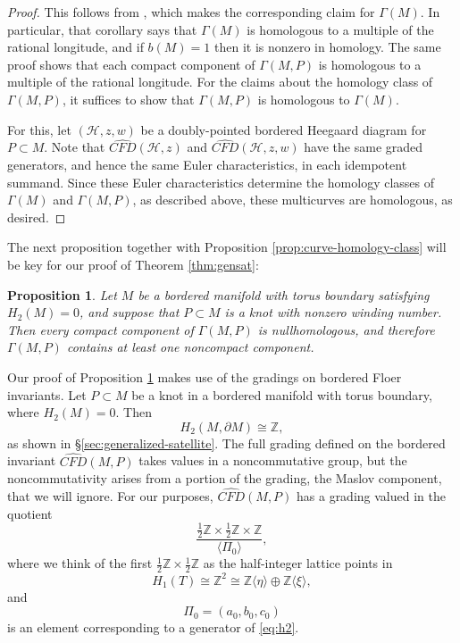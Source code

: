 \documentclass[11pt]{amsart}
\newtheorem {proposition}[theorem]{Proposition}
\numberwithin{equation}{section}
\numberwithin{theorem}{section}
\theoremstyle{definition}
\newcommand{\Z}{\mathbb{Z}}
\newcommand{\CFD}{\widehat{\mathit{CFD}}}
\begin{document}
\begin{proof}
This follows from \cite[Corollary 6.6]{hrw}, which makes the corresponding claim for $\Gamma(M)$. In particular, that corollary says that  $\Gamma(M)$ is homologous to a multiple of the rational longitude, and if $b(M)=1$ then it is nonzero in homology. The same proof shows that each compact component of $\Gamma(M, P)$ is homologous to a multiple of the rational longitude. For the claims about the  homology class of $\Gamma(M,P)$, it  suffices to show that $\Gamma(M,P)$ is homologous to $\Gamma(M)$. 

For this, let $(\mathcal{H},z,w)$ be a doubly-pointed bordered Heegaard diagram for $P\subset M$. Note that $\CFD(\mathcal{H},z)$ and $\CFD(\mathcal{H},z,w)$ have the same graded generators, and hence the same Euler characteristics, in each idempotent summand. Since these Euler characteristics determine the homology classes of $\Gamma(M)$ and $\Gamma(M,P)$, as described above, these multicurves are homologous, as desired.
\end{proof}

The next proposition together with Proposition \ref{prop:curve-homology-class} will be  key for our proof of Theorem \ref{thm:gensat}:

\begin{proposition}\label{prop:noncompact}
Let $M$ be a bordered manifold with torus boundary satisfying $H_2(M)=0$, and suppose that $P\subset M$ is a knot with nonzero winding number. Then every compact component of $\Gamma(M,P)$ is nullhomologous, and therefore $\Gamma(M, P)$ contains at least one noncompact component.
\end{proposition}


Our proof of Proposition \ref{prop:noncompact} makes use of the gradings on bordered Floer invariants. Let $P\subset M$ be a knot in a bordered manifold with torus boundary, where $H_2(M)=0$. Then
\begin{equation}\label{eq:h2}
H_2(M,\partial M)\cong \Z,
\end{equation}
as shown in \S\ref{sec:generalized-satellite}.  The full grading defined on the bordered invariant $\CFD(M,P)$ takes values in a noncommutative group, but the noncommutativity arises from a portion of the grading, the Maslov component, that we will ignore. For our purposes, $\CFD(M,P)$ has a grading valued in the quotient \[\frac{\tfrac 1 2 \Z \times \tfrac 1 2 \Z \times \Z}{\langle\Pi_0\rangle},\] where we think of the first $\tfrac 1 2 \Z \times \tfrac 1 2 \Z$ as the half-integer lattice points in \[H_1(T)\cong\Z^2\cong \Z\langle \eta\rangle \oplus \Z\langle \xi\rangle,\] and \[\Pi_0 = (a_0, b_0, c_0)\] is an element corresponding to a generator of \eqref{eq:h2}.
\end{document}
